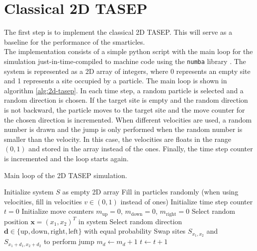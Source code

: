 \section{Classical 2D TASEP}
\label{sec:implementation-classical-2d-tasep}
The first step is to implement the classical 2D TASEP. This will serve as a baseline for the performance of the smarticles. 
\\
The implementation consists of a simple python script with the main loop for the simulation just-in-time-compiled to machine code using the \texttt{numba} library \cite{lam_numba_2015}. The system is represented as a 2D array of integers, where 0 represents an empty site and 1 represents a site occupied by a particle. The main loop is shown in algorithm \ref{alg:2d-tasep}. In each time step, a random particle is selected and a random direction is chosen. If the target site is empty and the random direction is not backward, the particle moves to the target site and the move counter for the chosen direction is incremented. When different velocities are used, a random number is drawn and the jump is only performed when the random number is smaller than the velocity. In this case, the velocities are floats in the range $(0,1)$ and stored in the array instead of the ones. Finally, the time step counter is incremented and the loop starts again.

\begin{algorithm}[H]
    \caption{Main loop of the 2D TASEP simulation.}
    \label{alg:2d-tasep}
    \begin{algorithmic}
        \State Initialize system $S$ as empty 2D array
        \State Fill in particles randomly (when using velocities, fill in velocities $v\in (0,1)$ instead of ones)
        \State Initialize time step counter $t=0$
        \State Initialize move counters $m_{\text{up}}=0$, $m_{\text{down}}=0$, $m_{\text{right}}=0$
            \State Select random position $\bm{x}=(x_1,x_2)^T$ in system
                \State Select random direction $\bm{d} \in \{\text{up}, \text{down}, \text{right}, \text{left}\}$ with equal probability
                    \State Swap sites $S_{x_1,x_2}$ and $S_{x_1+d_1,x_2+d_2}$ to perform jump
                    \State $m_d \gets m_d + 1$
                \EndIf
            \EndIf
            \State $t \gets t+1$
        \EndWhile
\end{algorithmic}
\end{algorithm}

